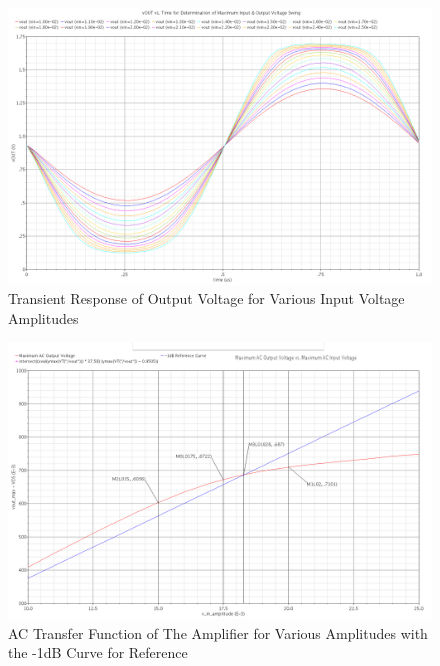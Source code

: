 \documentclass{article}
\begin{document}
\begin{figure}[H]
\centering
\includegraphics[width=5in]{2_cs_transient.png}
\caption{Transient Response of Output Voltage for Various Input Voltage Amplitudes}
\label{cs_tran}
\end{figure}

\begin{figure}[H]
\centering
\includegraphics[width=5in]{2_cs_linearity.png}
\caption{AC Transfer Function of The Amplifier for Various Amplitudes with the -1dB Curve for Reference}
\label{cs_lin}
\end{figure}
\end{document}
